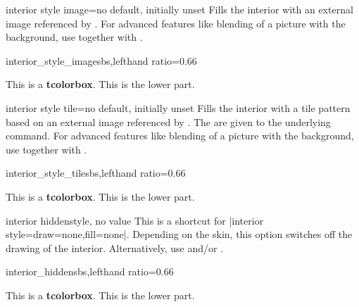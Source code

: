 \clearpage
\begin{docTcbKey}{interior style image}{=}{no default, initially unset}
  Fills the interior with an external image referenced by .
  For advanced features like blending of a picture with the background,
  use  together with .
\begin{exdispExample*}{interior_style_image}{sbs,lefthand ratio=0.66}

\begin{tcolorbox}[enhanced,title=My title,
  interior style image=goldshade.png]
This is a \textbf{tcolorbox}.
\tcblower
This is the lower part.
\end{tcolorbox}
\end{exdispExample*}
\end{docTcbKey}


\begin{docTcbKey}{interior style tile}{=}{no default, initially unset}
  Fills the interior with a tile pattern based on an external image referenced by .
  The  are given to the underlying  command.
  For advanced features like blending of a picture with the background,
  use  together with .

\begin{exdispExample*}{interior_style_tile}{sbs,lefthand ratio=0.66}

\begin{tcolorbox}[enhanced,title=My title,
  interior style tile={width=2cm}{crinklepaper.png}]
This is a \textbf{tcolorbox}.
\tcblower
This is the lower part.
\end{tcolorbox}
\end{exdispExample*}
\end{docTcbKey}


\begin{docTcbKey}{interior hidden}{}{style, no value}
  This is a shortcut for |interior style={draw=none,fill=none}|.
  Depending on the skin, this option switches off the drawing of the
  interior.
  Alternatively, use  and/or .
\begin{exdispExample*}{interior_hidden}{sbs,lefthand ratio=0.66}

\begin{tcolorbox}[enhanced,title=My title,
  interior hidden]
This is a \textbf{tcolorbox}.
\tcblower
This is the lower part.
\end{tcolorbox}
\end{exdispExample*}
\end{docTcbKey}

